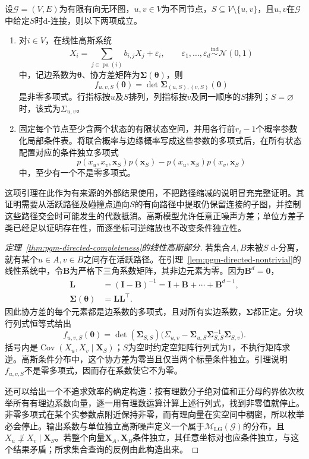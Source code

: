 \begin{lemma}[条件独立约束的非平凡性]
  \label{lem:pgm-directed-nontrivial}
  设$\mathcal{G}=(V,E)$为有限有向无环图，$u,v\in V$为不同节点，$S\subseteq V\setminus\{u,v\}$，且$u,v$在$\mathcal{G}$中给定$S$时d-连接，则以下两项成立。
  \begin{enumerate}
    \item 对$i\in V$，在线性高斯系统
    \[
      X_i=\sum_{j\in\operatorname{pa}(i)}b_{i,j}X_j+\varepsilon_i,
      \qquad
      \varepsilon_1,\ldots,\varepsilon_d
      \mathrel{\overset{\mathrm{ind}}{\sim}}\mathcal N(0,1)
    \]
    中，记边系数为$\bm{\theta}$、协方差矩阵为$\bm{\Sigma}(\bm{\theta})$，则
    \[
      f_{u,v,S}(\bm{\theta})
      =\det\bm{\Sigma}_{(u,S),(v,S)}(\bm{\theta})
    \]
    是非零多项式。行指标按$u$及$S$排列，列指标按$v$及同一顺序的$S$排列；$S=\varnothing$时，该式为$\Sigma_{u,v}$。
    \item 固定每个节点至少含两个状态的有限状态空间，并用各行前$r_i-1$个概率参数化局部条件表。将联合概率与边缘概率写成这些参数的多项式后，在所有状态配置对应的条件独立多项式
    \[
      p(x_u,x_v,\bm{x}_S)p(\bm{x}_S)
      -p(x_u,\bm{x}_S)p(x_v,\bm{x}_S)
    \]
    中，至少有一个不是零多项式。
  \end{enumerate}
\end{lemma}

这项引理在此作为有来源的外部结果使用，不把路径缩减的说明冒充完整证明。其证明需要从活跃路径及碰撞点通向$S$的有向路径中提取仍保留连接的子图，并控制这些路径交会时可能发生的代数抵消。高斯模型允许任意正噪声方差；单位方差子类已经足以证明存在性，而逐坐标可逆缩放也不改变条件独立性。

\begin{proof}[定理~\ref{thm:pgm-directed-completeness}的线性高斯部分]
若集合$A,B$未被$S$ d-分离，就有某个$u\in A,v\in B$之间存在活跃路径。在引理~\ref{lem:pgm-directed-nontrivial}的线性系统中，令$\bm{B}$为严格下三角系数矩阵，其非边元素为零。因为$\bm{B}^d=\bm 0$，
\[
  \begin{aligned}
    \bm{L}&=(\bm{I}-\bm{B})^{-1}
       =\bm{I}+\bm{B}+\cdots+\bm{B}^{d-1},\\
    \bm{\Sigma}(\bm{\theta})&=\bm{L}\bm{L}^{\top}.
  \end{aligned}
\]
因此协方差的每个元素都是边系数的多项式，且对所有实边系数，$\bm{\Sigma}$都正定。分块行列式恒等式给出
\[
  f_{u,v,S}(\bm{\theta})
    =\det(\bm{\Sigma}_{S,S})
      \bigl(\Sigma_{u,v}
        -\bm{\Sigma}_{u,S}\bm{\Sigma}_{S,S}^{-1}
         \bm{\Sigma}_{S,v}\bigr).
\]
括号内是$\operatorname{Cov}(X_u,X_v\mid\bm X_S)$；$S$为空时约定空矩阵行列式为$1$，不执行矩阵求逆。高斯条件分布中，这个协方差为零当且仅当两个标量条件独立。引理说明$f_{u,v,S}$不是零多项式，因而存在系数使它不为零。

还可以给出一个不追求效率的确定构造：按有理数分子绝对值和正分母的界依次枚举所有有理边系数向量，逐一用有理数运算计算上述行列式，找到非零值就停止。非零多项式在某个实参数点附近保持非零，而有理向量在实空间中稠密，所以枚举必会停止。输出系数与单位独立高斯噪声定义一个属于$\mathcal{M}_{\mathrm{LG}}(\mathcal{G})$的分布，且$X_u\not\perp X_v\mid\bm X_S$。若整个向量$\bm X_A,\bm X_B$条件独立，其任意坐标对也应条件独立，与这个结果矛盾；所求集合查询的反例由此构造出来。
\end{proof}

